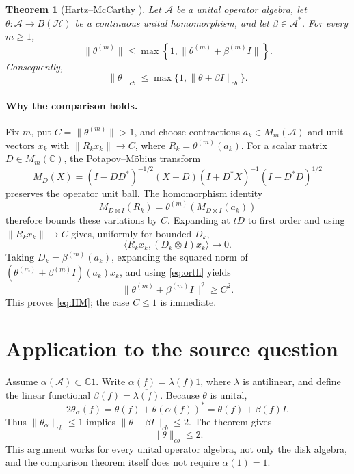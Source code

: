 \documentclass[11pt]{article}
\newtheorem{theorem}{Theorem}
\newcommand{\A}{\mathcal A}
\newcommand{\C}{\mathbb C}
\begin{document}
\begin{theorem}[Hartz--McCarthy \cite{answer}]
Let \(\A\) be a unital operator algebra, let
\(\theta:\A\to B(\mathcal H)\) be a continuous unital homomorphism, and let
\(\beta\in\A^*\).  For every \(m\ge1\),
\begin{equation}\label{eq:HM}
 \|\theta^{(m)}\|
 \le \max\!\left\{1,
 \|\theta^{(m)}+\beta^{(m)}I\|\right\}.
\end{equation}
Consequently,
\[
 \|\theta\|_{cb}\le
 \max\{1,\|\theta+\beta I\|_{cb}\}.
\]
\end{theorem}

\paragraph{Why the comparison holds.}
Fix \(m\), put \(C=\|\theta^{(m)}\|>1\), and choose contractions
\(a_k\in M_m(\A)\) and unit vectors \(x_k\) with
\(\|R_kx_k\|\to C\), where \(R_k=\theta^{(m)}(a_k)\).
For a scalar matrix \(D\in M_m(\C)\), the Potapov--M\"obius transform
\[
 M_D(X)=(I-DD^*)^{-1/2}(X+D)(I+D^*X)^{-1}(I-D^*D)^{1/2}
\]
preserves the operator unit ball.  The homomorphism identity
\[
 M_{D\otimes I}(R_k)
 =\theta^{(m)}\!\left(M_{D\otimes I}(a_k)\right)
\]
therefore bounds these variations by \(C\).  Expanding at \(tD\) to first
order and using \(\|R_kx_k\|\to C\) gives, uniformly for bounded \(D_k\),
\begin{equation}\label{eq:orth}
 \langle R_kx_k,(D_k\otimes I)x_k\rangle\longrightarrow0.
\end{equation}
Taking \(D_k=\beta^{(m)}(a_k)\), expanding the squared norm of
\((\theta^{(m)}+\beta^{(m)}I)(a_k)x_k\), and using
\eqref{eq:orth} yields
\[
 \|\theta^{(m)}+\beta^{(m)}I\|^2\ge C^2.
\]
This proves \eqref{eq:HM}; the case \(C\le1\) is immediate.

\section*{Application to the source question}
Assume \(\alpha(\A)\subset\C1\).  Write
\(\alpha(f)=\lambda(f)1\), where \(\lambda\) is antilinear, and define the
linear functional \(\beta(f)=\overline{\lambda(f)}\).  Because \(\theta\)
is unital,
\[
 2\theta_\alpha(f)
 =\theta(f)+\theta(\alpha(f))^*
 =\theta(f)+\beta(f)I.
\]
Thus \(\|\theta_\alpha\|_{cb}\le1\) implies
\(\|\theta+\beta I\|_{cb}\le2\).  The theorem gives
\[
 \boxed{\|\theta\|_{cb}\le2}.
\]
This argument works for every unital operator algebra, not only the disk
algebra, and the comparison theorem itself does not require \(\alpha(1)=1\).
\end{document}
